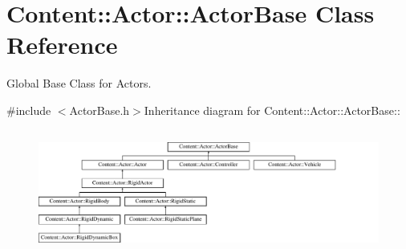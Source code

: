 \hypertarget{classContent_1_1Actor_1_1ActorBase}{
\section{Content::Actor::ActorBase Class Reference}
\label{classContent_1_1Actor_1_1ActorBase}
}


Global Base Class for Actors.  


{\ttfamily \#include $<$ActorBase.h$>$}Inheritance diagram for Content::Actor::ActorBase::\begin{figure}[H]
\begin{center}
\leavevmode
\includegraphics[height=4.11765cm]{classContent_1_1Actor_1_1ActorBase}
\end{center}
\end{figure}
